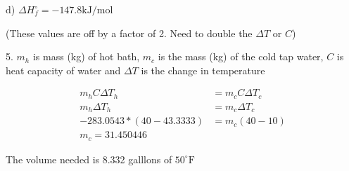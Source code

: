 \documentclass[11pt]{article}
\begin{document}
d) $\Delta H^\circ_f = -147.8\text{kJ/mol}$

(These values are off by a factor of 2. Need to double the $\Delta T$ or $C$)

5. $m_h$ is mass (kg) of hot bath, $m_c$ is the mass (kg) of the cold tap water, $C$ is
heat capacity of water and $\Delta T$ is the change in temperature

\begin{align}
  m_h C \Delta T_h & = m_c C \Delta T_c \\
  m_h \Delta T_h & = m_c \Delta T_c \\
  -283.0543*(40 - 43.3333) & = m_c (40 - 10) \\
  m_c = 31.450446
\end{align}

The volume needed is 8.332 galllons of $50^\circ\text{F}$

\pagebreak
\end{document}
